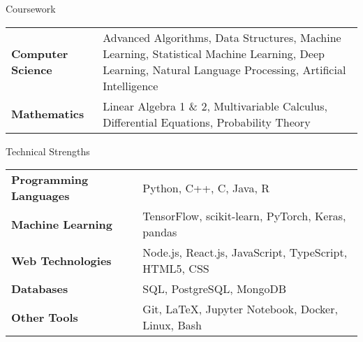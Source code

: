 \documentclass[
    11pt, %
]{resume} %
\begin{document}
\begin{rSection}{Coursework}
\vspace*{-0.3cm}
  \begin{tabular}{ @{} >{\bfseries}l p{14cm} }
    Computer Science & Advanced Algorithms, Data Structures, Machine Learning, Statistical Machine Learning, Deep Learning, Natural Language Processing, Artificial Intelligence \\
    Mathematics & Linear Algebra 1 \& 2, Multivariable Calculus, Differential Equations, Probability Theory \\
  \end{tabular}
\end{rSection}
\vspace*{-0.2cm}

\vspace*{-0.3cm}
\begin{rSection}{Technical Strengths}
\vspace*{-0.3cm}


\begin{tabular}{ @{} >{\bfseries}l @{\hspace{6ex}} l }
    Programming Languages & Python, C++, C, Java, R \\
    Machine Learning & TensorFlow, scikit-learn, PyTorch, Keras, pandas \\
    Web Technologies & Node.js, React.js, JavaScript, TypeScript, HTML5, CSS  \\
    Databases & SQL, PostgreSQL, MongoDB \\
    Other Tools & Git, LaTeX, Jupyter Notebook, Docker, Linux, Bash \\
\end{tabular} 


\end{rSection}
\end{document}
